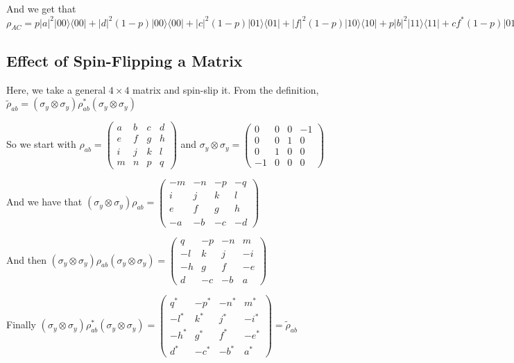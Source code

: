 \documentclass[12pt,a4paper]{article}
\numberwithin{equation}{section}
\begin{document}
\vskip 5mm

And we get that $\rho_{AC} = p|a|^2|00\rangle\langle00| + |d|^2(1-p)|00\rangle\langle00| + |c|^2(1-p)|01\rangle\langle01| + |f|^2(1-p)|10\rangle\langle10| + p|b|^2|11\rangle\langle11| + cf^*(1-p)|01\rangle\langle10| + fc^*(1-p)|10\rangle\langle01|$




\newpage

\subsection{Effect of Spin-Flipping a Matrix}
\label{app:spinFlip}

Here, we take a general $4 \times 4$ matrix and spin-slip it. From the definition, $\tilde{\rho}_{ab} = (\sigma_y\otimes\sigma_y)\rho_{ab}^*(\sigma_y\otimes\sigma_y)$

So we start with $\rho_{ab} = \begin{pmatrix} a & b & c & d \\ e & f & g & h \\ i & j & k & l \\ m & n & p & q \end{pmatrix}$ and $\sigma_y\otimes\sigma_y = \begin{pmatrix} 0 & 0 & 0 & -1 \\ 0 & 0 & 1 & 0 \\ 0 & 1 & 0 & 0 \\ -1 & 0 & 0 & 0 \end{pmatrix}$

And we have that $(\sigma_y\otimes\sigma_y)\rho_{ab} = \begin{pmatrix} -m & -n & -p & -q \\ i & j & k & l \\ e & f & g & h \\ -a & -b & -c & -d \end{pmatrix}$

And then $(\sigma_y\otimes\sigma_y)\rho_{ab}(\sigma_y\otimes\sigma_y) = \begin{pmatrix} q & -p & -n & m \\ -l & k & j & -i \\ -h & g & f & -e \\ d & -c & -b & a \end{pmatrix}$


Finally $(\sigma_y\otimes\sigma_y)\rho_{ab}^*(\sigma_y\otimes\sigma_y) = \begin{pmatrix} q^* & -p^* & -n^* & m^* \\ -l^* & k^* & j^* & -i^* \\ -h^* & g^* & f^* & -e^* \\ d^* & -c^* & -b^* & a^* \end{pmatrix} = \tilde{\rho}_{ab}$
\end{document}
